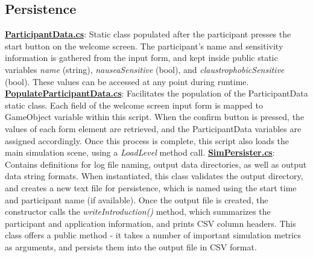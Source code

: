 \documentclass{article}
\begin{document}
\subsection*{Persistence} 
\href{https://bit.ly/2Fhq8B2}{\textbf{ParticipantData.cs}}: Static class populated after the participant presses the start button on the welcome screen. The participant's name and sensitivity information is gathered from the input form, and kept inside public static variables \textit{name} (string), \textit{nauseaSensitive} (bool), and \textit{claustrophobicSensitive} (bool). These values can be accessed at any point during runtime. \newline \newline
\href{https://bit.ly/2WgL6qR}{\textbf{PopulateParticipantData.cs}}: Facilitates the population of the ParticipantData static class. Each field of the welcome screen input form is mapped to GameObject variable within this script. When the confirm button is pressed, the values of each form element are retrieved, and the ParticipantData variables are assigned accordingly. Once this process is complete, this script also loads the main simulation scene, using a \textit{LoadLevel} method call. \newline \newline
\href{https://bit.ly/2OdbwH6}{\textbf{SimPersister.cs}}: Contains definitions for log file naming, output data directories, as well as output data string formats. When instantiated, this class validates the output directory, and creates a new text file for persistence, which is named using the start time and participant name (if available). Once the output file is created, the constructor calls the \textit{writeIntroduction()} method, which summarizes the participant and application information, and prints CSV column headers. This class offers a public method  - it takes a number of important simulation metrics as arguments, and persists them into the output file in CSV format.
\end{document}
